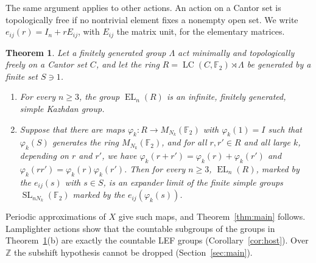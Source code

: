 \documentclass[11pt]{amsart}
\newtheorem{theorem}{Theorem}
\newcommand{\F}{\mathbb F}
\newcommand{\Z}{\mathbb Z}
\newcommand{\LC}{\operatorname{LC}}
\newcommand{\EL}{\operatorname{EL}}
\newcommand{\SL}{\operatorname{SL}}
\begin{document}
The same argument applies to other actions. An action on a Cantor set is
topologically free if no nontrivial element fixes a nonempty open set. We
write $e_{ij}(r)=I_n+rE_{ij}$, with $E_{ij}$ the matrix unit, for the
elementary matrices.

\begin{theorem}\label{thm:general}
Let a finitely generated group $\Lambda$ act minimally and topologically
freely on a Cantor set $C$, and let the ring $R=\LC(C,\F_2)\rtimes\Lambda$
be generated by a finite set $S\ni1$.
\begin{enumerate}
\item[\textup{(a)}] For every $n\ge3$, the group $\EL_n(R)$ is an infinite,
finitely generated, simple Kazhdan group.
\item[\textup{(b)}] Suppose that there are maps
$\varphi_k\colon R\to M_{N_k}(\F_2)$ with $\varphi_k(1)=I$ such that
$\varphi_k(S)$ generates the ring $M_{N_k}(\F_2)$, and for all
$r,r'\in R$ and all large $k$, depending on $r$ and $r'$, we have
$\varphi_k(r+r')=\varphi_k(r)+\varphi_k(r')$ and
$\varphi_k(rr')=\varphi_k(r)\varphi_k(r')$. Then for every $n\ge3$,
$\EL_n(R)$, marked by the $e_{ij}(s)$ with $s\in S$, is an expander limit
of the finite simple groups $\SL_{nN_k}(\F_2)$ marked by the
$e_{ij}(\varphi_k(s))$.
\end{enumerate}
\end{theorem}

Periodic approximations of $X$ give such maps, and Theorem~\ref{thm:main}
follows. Lamplighter actions show that the countable subgroups of the
groups in Theorem~\ref{thm:general}\textup{(b)} are exactly the countable
LEF groups (Corollary~\ref{cor:host}). Over $\Z$ the subshift hypothesis
cannot be dropped (Section~\ref{sec:main}).
\end{document}
